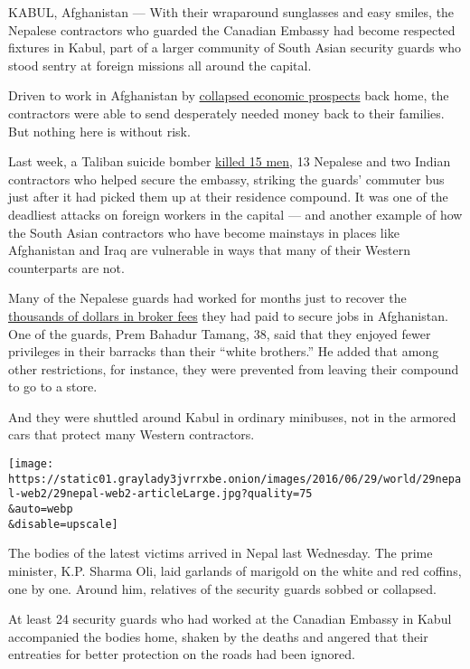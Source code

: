 KABUL, Afghanistan --- With their wraparound sunglasses and easy smiles,
the Nepalese contractors who guarded the Canadian Embassy had become
respected fixtures in Kabul, part of a larger community of South Asian
security guards who stood sentry at foreign missions all around the
capital.

Driven to work in Afghanistan by
\href{https://www.washingtonpost.com/world/asia_pacific/nepal-once-known-for-farming-now-exports-people-migrants-earn-big-but-face-risks/2014/03/23/5858ca52-8441-11e3-bbe5-6a2a3141e3a9_story.html}{collapsed
economic prospects} back home, the contractors were able to send
desperately needed money back to their families. But nothing here is
without risk.

Last week, a Taliban suicide bomber
\href{https://www.nytimes3xbfgragh.onion/2016/06/21/world/asia/afghanistan-kabul-suicide-attack.html}{killed
15 men}, 13 Nepalese and two Indian contractors who helped secure the
embassy, striking the guards' commuter bus just after it had picked them
up at their residence compound. It was one of the deadliest attacks on
foreign workers in the capital --- and another example of how the South
Asian contractors who have become mainstays in places like Afghanistan
and Iraq are vulnerable in ways that many of their Western counterparts
are not.

Many of the Nepalese guards had worked for months just to recover the
\href{http://america.aljazeera.com/watch/shows/fault-lines/Episodes/2014/3/7/america-s-war-workers.html}{thousands
of dollars in broker fees} they had paid to secure jobs in Afghanistan.
One of the guards, Prem Bahadur Tamang, 38, said that they enjoyed fewer
privileges in their barracks than their ``white brothers.'' He added
that among other restrictions, for instance, they were prevented from
leaving their compound to go to a store.

And they were shuttled around Kabul in ordinary minibuses, not in the
armored cars that protect many Western contractors.

\texttt{[image: https://static01.graylady3jvrrxbe.onion/images/2016/06/29/world/29nepal-web2/29nepal-web2-articleLarge.jpg?quality=75\\\&auto=webp\\\&disable=upscale]}

The bodies of the latest victims arrived in Nepal last Wednesday. The
prime minister, K.P. Sharma Oli, laid garlands of marigold on the white
and red coffins, one by one. Around him, relatives of the security
guards sobbed or collapsed.

At least 24 security guards who had worked at the Canadian Embassy in
Kabul accompanied the bodies home, shaken by the deaths and angered that
their entreaties for better protection on the roads had been ignored.


